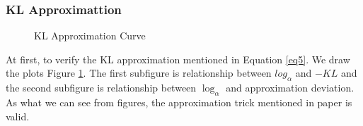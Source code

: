 \documentclass{article}
\begin{document}
	\subsubsection{KL Approximattion}
		\begin{figure}[H]
			\centering
			\caption{KL Approximation Curve}
			\label{fig:exp1}
		\end{figure}
	At first, to verify the KL approximation mentioned in Equation \ref{eq5}. We draw the plots Figure \ref{fig:exp1}. The first subfigure is relationship between $log_{\alpha}$ and $-KL$ and the second subfigure is relationship between $\log_{\alpha}$ and approximation deviation. As what we can see from figures, the approximation trick mentioned in paper \cite{molchanov2017variational} is valid.
\end{document}
